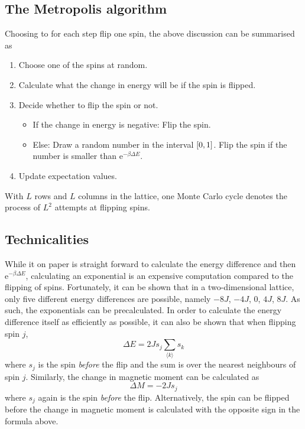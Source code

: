 \documentclass[12pt,english,a4paper]{article}
\renewcommand{\exp}[1]{\mathrm{e}^{#1}}
\begin{document}
\subsection{The Metropolis algorithm}
Choosing to for each step flip one spin, the above discussion can be summarised as
\begin{enumerate}
\item Choose one of the spins at random.
\item Calculate what the change in energy will be if the spin is flipped.
\item Decide whether to flip the spin or not.
\begin{itemize}
\item If the change in energy is negative: Flip the spin.
\item Else: Draw a random number in the interval \(\qty[0,1]\). Flip the spin if the number is smaller than \(\exp{-\beta\Delta E}\).
\end{itemize}
\item Update expectation values.
\end{enumerate}
With \(L\) rows and \(L\) columns in the lattice, one Monte Carlo cycle denotes the process of \(L^2\) attempts at flipping spins.

\subsection{Technicalities}
While it on paper is straight forward to calculate the energy difference and then \(\exp{-\beta \Delta E}\), calculating an exponential is an expensive computation compared to the flipping of spins. Fortunately, it can be shown\autocite{compphys} that in a two-dimensional lattice, only five different energy differences are possible, namely \(-8J\), \(-4J\), \(0\), \(4J\), \(8J\). As such, the exponentials can be precalculated. In order to calculate the energy difference itself as efficiently as possible, it can also be shown that when flipping spin \(j\),
\[
\Delta E = 2Js_j\sum_{\langle k\rangle} s_k
\]
where \(s_j\) is the spin \emph{before} the flip and the sum is over the nearest neighbours of spin \(j\). Similarly, the change in magnetic moment can be calculated as
\[
\Delta M = -2Js_j
\]
where \(s_j\) again is the spin \emph{before} the flip. Alternatively, the spin can be flipped before the change in magnetic moment is calculated with the opposite sign in the formula above.



\clearpage
\end{document}
